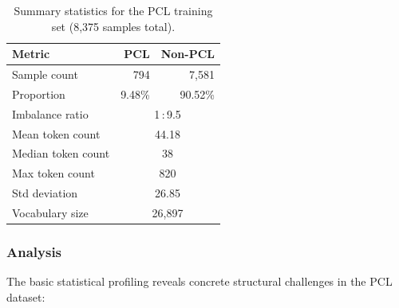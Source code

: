 \documentclass[11pt,a4paper]{article}
\begin{document}
\begin{table}[H]
    \centering
    \begin{tabular}{lrr}
        \toprule
        \textbf{Metric}    & \textbf{PCL}                  & \textbf{Non-PCL} \\
        \midrule
        Sample count       & 794                           & 7{,}581          \\
        Proportion         & 9.48\%                        & 90.52\%          \\
        Imbalance ratio    & \multicolumn{2}{c}{1\,:\,9.5}                    \\
        \midrule
        Mean token count   & \multicolumn{2}{c}{44.18}                        \\
        Median token count & \multicolumn{2}{c}{38}                           \\
        Max token count    & \multicolumn{2}{c}{820}                          \\
        Std deviation      & \multicolumn{2}{c}{26.85}                        \\
        \midrule
        Vocabulary size    & \multicolumn{2}{c}{26{,}897}                     \\
        \bottomrule
    \end{tabular}
    \caption{Summary statistics for the PCL training set (8{,}375 samples total).}
    \label{tab:eda1}
\end{table}

\subsubsection{Analysis}

The basic statistical profiling reveals concrete structural challenges in the PCL dataset:
\end{document}

